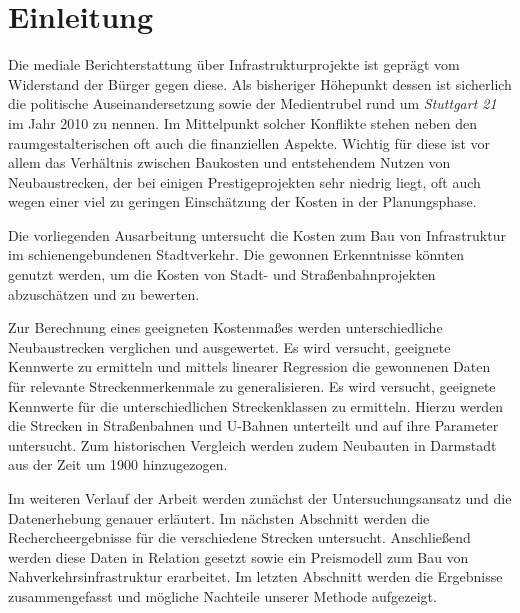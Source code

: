 \chapter{Einleitung}


Die mediale Berichterstattung über Infrastrukturprojekte ist geprägt vom Widerstand der
Bürger gegen diese. Als bisheriger Höhepunkt dessen ist sicherlich die politische
Auseinandersetzung sowie der Medientrubel rund um \emph{Stuttgart 21} im
Jahr 2010 zu nennen. Im Mittelpunkt solcher Konflikte stehen neben den raumgestalterischen
oft auch die finanziellen Aspekte. Wichtig für diese ist vor allem das Verhältnis zwischen
Baukosten und entstehendem Nutzen von Neubaustrecken, der bei einigen
Prestigeprojekten sehr niedrig liegt, oft auch wegen einer viel zu geringen Einschätzung
der Kosten in der Planungsphase.

Die vorliegenden Ausarbeitung untersucht die Kosten zum Bau von Infrastruktur im
schienengebundenen Stadtverkehr. Die gewonnen Erkenntnisse könnten genutzt werden, um die
Kosten von Stadt- und Straßenbahnprojekten abzuschätzen und zu bewerten.

Zur Berechnung eines geeigneten Kostenmaßes werden unterschiedliche
Neubaustrecken verglichen und ausgewertet. Es wird versucht, geeignete
Kennwerte zu ermitteln und mittels linearer Regression die gewonnenen Daten
für relevante Streckenmerkenmale zu generalisieren. Es wird versucht, geeignete Kennwerte
für die unterschiedlichen Streckenklassen zu ermitteln. Hierzu werden die Strecken in Straßenbahnen
und U-Bahnen unterteilt und auf ihre Parameter untersucht. Zum historischen
Vergleich werden zudem Neubauten in Darmstadt aus der Zeit um 1900 hinzugezogen.

Im weiteren Verlauf der Arbeit werden zunächst der Untersuchungsansatz und die
Datenerhebung genauer erläutert. Im nächsten Abschnitt werden die Rechercheergebnisse
für die verschiedene Strecken untersucht. Anschließend werden diese Daten in Relation
gesetzt sowie ein Preismodell zum Bau von Nahverkehrsinfrastruktur erarbeitet. Im letzten
Abschnitt werden die Ergebnisse zusammengefasst und mögliche Nachteile unserer Methode
aufgezeigt.
